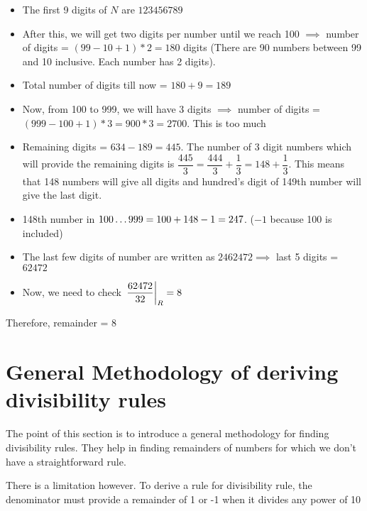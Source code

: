 \begin{itemize}
    \item The first 9 digits of $N$ are $123456789$

    \item After this, we will get two digits per number until we reach 100 $\implies$ number of digits = $(99 - 10 + 1) * 2 = 180$ digits (There are 90 numbers between 99 and 10 inclusive. Each number has 2 digits). 

    \item Total number of digits till now = $180 + 9 = 189$

    \item Now, from 100 to 999, we will have 3 digits $\implies$ number of digits = $(999 - 100 + 1)*3 = 900*3 = 2700$. This is too much

    \item Remaining digits = $634 - 189 = 445$. The number of 3 digit numbers which will provide the remaining digits is $\dfrac{445}{3} = \dfrac{444}{3} + \dfrac{1}{3} = 148 + \dfrac{1}{3}$. This means that 148 numbers will give all digits and hundred's digit of 149th number will give the last digit.

    \item 148th number in ${100} \ldots {999} = 100 + 148 -1 = 247$. ($-1$ because 100 is included) 

    \item The last few digits of number are written as $2462472 \implies$ last 5 digits = $62472$

    \item Now, we need to check $\displaystyle{ \left. \frac{62472}{32} \right |_{R} } = 8$
\end{itemize}

Therefore, remainder = 8

\section{General Methodology of deriving divisibility rules}

The point of this section is to introduce a general methodology for finding divisibility rules. They help in finding remainders of numbers for which we don't have a straightforward rule. 

\begin{NOTE}
    There is a limitation however. To derive a rule for divisibility rule, the denominator must provide a remainder of 1 or -1 when it divides any power of 10
\end{NOTE}

